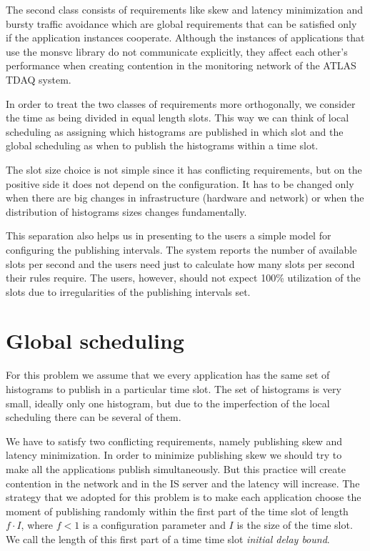 The second class consists of requirements like skew and latency minimization and bursty traffic avoidance which are global requirements that can be satisfied only if the application instances cooperate. Although the instances of applications that use the monsvc library do not communicate explicitly, they affect each other’s performance when creating contention in the monitoring network of the ATLAS TDAQ system. 

In order to treat the two classes of requirements more orthogonally, we consider the time as being divided in equal length slots. This way we can think of local scheduling as assigning which histograms are published in which slot and the global scheduling as when to publish the histograms within a time slot.

The slot size choice is not simple since it has conflicting requirements, but on the positive side it does not depend on the configuration. It has to be changed only when there are big changes in infrastructure (hardware and network) or when the distribution of histograms sizes changes fundamentally.

This separation also helps us in presenting to the users a simple model for configuring the publishing intervals. The system reports the number of available slots per second and the users need just to calculate how many slots per second their rules require. The users, however, should not expect 100\% utilization of the slots due to irregularities of the publishing intervals set.

\section{Global scheduling}

For this problem we assume that we every application has the same set of histograms to publish in a particular time slot. The set of histograms is very small, ideally only one histogram, but due to the imperfection of the local scheduling there can be several of them.

We have to satisfy two conflicting requirements, namely publishing skew and latency minimization. In order to minimize publishing skew we should try to make all the applications publish simultaneously. But this practice will create contention in the network and in the IS server and the latency will increase. 
The strategy that we adopted for this problem is to make each application choose the moment of publishing randomly within the first part of the time slot of length $f\cdot I$, where $f<1$ is a configuration parameter and $I$ is the size of the time slot. We call the length of this first part of a time time slot \emph{initial delay bound}.

